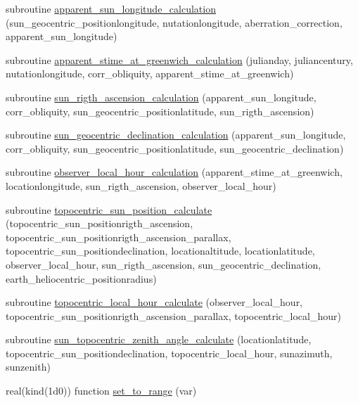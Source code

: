 \begin{DoxyCompactItemize}
\item 
subroutine \hyperlink{_n_a_r_p__sun__position__v2_8f95_acff843ecba5d172c4f05df7eede5ac9e}{apparent\+\_\+sun\+\_\+longitude\+\_\+calculation} (sun\+\_\+geocentric\+\_\+positionlongitude, nutationlongitude, aberration\+\_\+correction, apparent\+\_\+sun\+\_\+longitude)
\item 
subroutine \hyperlink{_n_a_r_p__sun__position__v2_8f95_a0ed15a11ed5c5996a2c4fbe71b31d52d}{apparent\+\_\+stime\+\_\+at\+\_\+greenwich\+\_\+calculation} (julianday, juliancentury, nutationlongitude, corr\+\_\+obliquity, apparent\+\_\+stime\+\_\+at\+\_\+greenwich)
\item 
subroutine \hyperlink{_n_a_r_p__sun__position__v2_8f95_a2f8a78070378bcea144d0fac36d574f6}{sun\+\_\+rigth\+\_\+ascension\+\_\+calculation} (apparent\+\_\+sun\+\_\+longitude, corr\+\_\+obliquity, sun\+\_\+geocentric\+\_\+positionlatitude, sun\+\_\+rigth\+\_\+ascension)
\item 
subroutine \hyperlink{_n_a_r_p__sun__position__v2_8f95_a481de193e415240af11e74ec22e50570}{sun\+\_\+geocentric\+\_\+declination\+\_\+calculation} (apparent\+\_\+sun\+\_\+longitude, corr\+\_\+obliquity, sun\+\_\+geocentric\+\_\+positionlatitude, sun\+\_\+geocentric\+\_\+declination)
\item 
subroutine \hyperlink{_n_a_r_p__sun__position__v2_8f95_a424caca5b8ba1c7b5f230c2808d623bd}{observer\+\_\+local\+\_\+hour\+\_\+calculation} (apparent\+\_\+stime\+\_\+at\+\_\+greenwich, locationlongitude, sun\+\_\+rigth\+\_\+ascension, observer\+\_\+local\+\_\+hour)
\item 
subroutine \hyperlink{_n_a_r_p__sun__position__v2_8f95_ace8944aaa83c0cdac9ffc5bf8569f2fe}{topocentric\+\_\+sun\+\_\+position\+\_\+calculate} (topocentric\+\_\+sun\+\_\+positionrigth\+\_\+ascension, topocentric\+\_\+sun\+\_\+positionrigth\+\_\+ascension\+\_\+parallax, topocentric\+\_\+sun\+\_\+positiondeclination, locationaltitude, locationlatitude, observer\+\_\+local\+\_\+hour, sun\+\_\+rigth\+\_\+ascension, sun\+\_\+geocentric\+\_\+declination, earth\+\_\+heliocentric\+\_\+positionradius)
\item 
subroutine \hyperlink{_n_a_r_p__sun__position__v2_8f95_ae9ec08d0b901309126e9f9750f1beaf5}{topocentric\+\_\+local\+\_\+hour\+\_\+calculate} (observer\+\_\+local\+\_\+hour, topocentric\+\_\+sun\+\_\+positionrigth\+\_\+ascension\+\_\+parallax, topocentric\+\_\+local\+\_\+hour)
\item 
subroutine \hyperlink{_n_a_r_p__sun__position__v2_8f95_a71be86eba8ca05519a30c0544be877e8}{sun\+\_\+topocentric\+\_\+zenith\+\_\+angle\+\_\+calculate} (locationlatitude, topocentric\+\_\+sun\+\_\+positiondeclination, topocentric\+\_\+local\+\_\+hour, sunazimuth, sunzenith)
\item 
real(kind(1d0)) function \hyperlink{_n_a_r_p__sun__position__v2_8f95_a000bdf57aa5a15bc65fc0b3521f461e7}{set\+\_\+to\+\_\+range} (var)
\end{DoxyCompactItemize}


